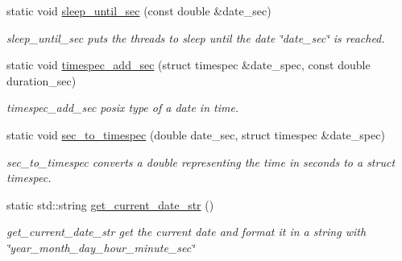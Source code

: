 \begin{DoxyCompactItemize}
static void \hyperlink{classreal__time__tools_1_1Timer_a8de5eedf9fe5607d78a703cd22665137}{sleep\+\_\+until\+\_\+sec} (const double \&date\+\_\+sec)
\begin{DoxyCompactList}\small\item\em sleep\+\_\+until\+\_\+sec puts the threads to sleep until the date \char`\"{}date\+\_\+sec\char`\"{} is reached. \end{DoxyCompactList}\item 
static void \hyperlink{classreal__time__tools_1_1Timer_a0055b704a4e0b518269b0ab5fbed9278}{timespec\+\_\+add\+\_\+sec} (struct timespec \&date\+\_\+spec, const double duration\+\_\+sec)
\begin{DoxyCompactList}\small\item\em timespec\+\_\+add\+\_\+sec posix type of a date in time. \end{DoxyCompactList}\item 
static void \hyperlink{classreal__time__tools_1_1Timer_a7370c65fa7810c6bcbe1b2f33e21f2ff}{sec\+\_\+to\+\_\+timespec} (double date\+\_\+sec, struct timespec \&date\+\_\+spec)
\begin{DoxyCompactList}\small\item\em sec\+\_\+to\+\_\+timespec converts a double representing the time in seconds to a struct timespec. \end{DoxyCompactList}\item 
\mbox{\label{classreal__time__tools_1_1Timer_a6e5ef2fc811582b8ff4fe52775525e14}} 
static std\+::string \hyperlink{classreal__time__tools_1_1Timer_a6e5ef2fc811582b8ff4fe52775525e14}{get\+\_\+current\+\_\+date\+\_\+str} ()
\begin{DoxyCompactList}\small\item\em get\+\_\+current\+\_\+date\+\_\+str get the current date and format it in a string with \char`\"{}year\+\_\+month\+\_\+day\+\_\+hour\+\_\+minute\+\_\+sec\char`\"{} \end{DoxyCompactList}\end{DoxyCompactItemize}
